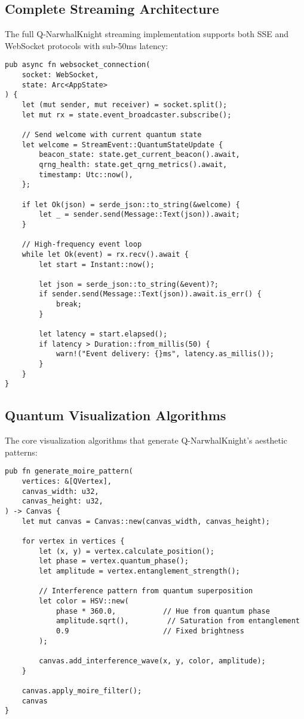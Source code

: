 \documentclass[12pt,a4paper]{article}
\begin{document}
\subsection{Complete Streaming Architecture}

The full Q-NarwhalKnight streaming implementation supports both SSE and WebSocket protocols with sub-50ms latency:

\begin{lstlisting}[caption=Complete WebSocket Handler]
pub async fn websocket_connection(
    socket: WebSocket, 
    state: Arc<AppState>
) {
    let (mut sender, mut receiver) = socket.split();
    let mut rx = state.event_broadcaster.subscribe();
    
    // Send welcome with current quantum state
    let welcome = StreamEvent::QuantumStateUpdate {
        beacon_state: state.get_current_beacon().await,
        qrng_health: state.get_qrng_metrics().await,
        timestamp: Utc::now(),
    };
    
    if let Ok(json) = serde_json::to_string(&welcome) {
        let _ = sender.send(Message::Text(json)).await;
    }
    
    // High-frequency event loop
    while let Ok(event) = rx.recv().await {
        let start = Instant::now();
        
        let json = serde_json::to_string(&event)?;
        if sender.send(Message::Text(json)).await.is_err() {
            break;
        }
        
        let latency = start.elapsed();
        if latency > Duration::from_millis(50) {
            warn!("Event delivery: {}ms", latency.as_millis());
        }
    }
}
\end{lstlisting}

\subsection{Quantum Visualization Algorithms}

The core visualization algorithms that generate Q-NarwhalKnight's aesthetic patterns:

\begin{lstlisting}[caption=Moiré Pattern Generation]
pub fn generate_moire_pattern(
    vertices: &[QVertex],
    canvas_width: u32,
    canvas_height: u32,
) -> Canvas {
    let mut canvas = Canvas::new(canvas_width, canvas_height);
    
    for vertex in vertices {
        let (x, y) = vertex.calculate_position();
        let phase = vertex.quantum_phase();
        let amplitude = vertex.entanglement_strength();
        
        // Interference pattern from quantum superposition
        let color = HSV::new(
            phase * 360.0,           // Hue from quantum phase
            amplitude.sqrt(),         // Saturation from entanglement
            0.9                      // Fixed brightness
        );
        
        canvas.add_interference_wave(x, y, color, amplitude);
    }
    
    canvas.apply_moire_filter();
    canvas
}
\end{lstlisting}
\end{document}
